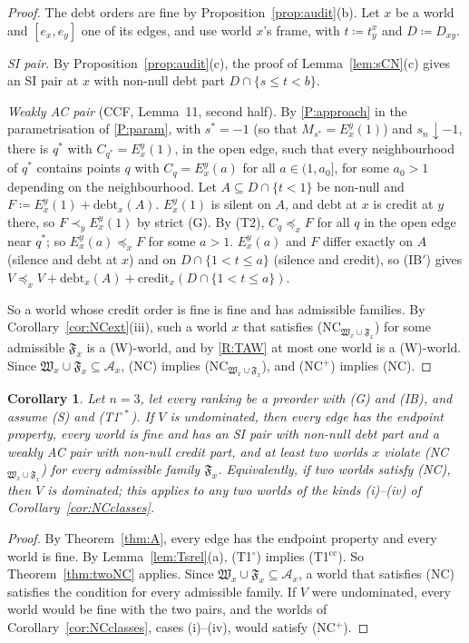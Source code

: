 \documentclass[11pt]{article}
\newtheorem{corollary}[theorem]{Corollary}
\theoremstyle{definition}\newtheorem{definition}[theorem]{Definition}
\theoremstyle{remark}\newtheorem{remark}[theorem]{Remark}
\newcommand{\debt}{\mathrm{debt}}
\newcommand{\cred}{\mathrm{credit}}
\newcommand{\To}{\textup{(T1$^\circ$)}}
\newcommand{\Tos}{\textup{(T1$^{\circ*}$)}}
\newcommand{\Tcc}{\textup{(T1$^{\mathrm{cc}}$)}}
\begin{document}
\begin{proof}
The debt orders are fine by Proposition~\ref{prop:audit}(b). Let $x$ be a
world and $[e_x,e_y]$ one of its edges, and use world $x$'s frame, with
$t\coloneqq t^x_y$ and $D\coloneqq D_{xy}$.

\emph{SI pair.} By Proposition~\ref{prop:audit}(c), the proof of
Lemma~\ref{lem:sCN}(c) gives an SI pair at $x$ with non-null debt part
$D\cap\{s\le t<b\}$.

\emph{Weakly AC pair} (CCF, Lemma~11, second half). By \ref{P:approach}
in the parametrisation of \ref{P:param}, with $s^*=-1$ (so that
$M_{s^*}=E^y_x(1)$) and $s_n\downarrow-1$, there is $q^*$ with
$C_{q^*}=E^y_x(1)$, in the open edge, such that every neighbourhood of $q^*$
contains points $q$ with $C_q=E^y_x(a)$ for all $a\in(1,a_0]$, for some
$a_0>1$ depending on the neighbourhood. Let $A\subseteq D\cap\{t<1\}$ be
non-null and $F\coloneqq E^y_x(1)+\debt_x(A)$. $E^y_x(1)$ is silent on $A$,
and debt at $x$ is credit at $y$ there, so $F\prec_yE^y_x(1)$ by strict (G).
By (T2), $C_q\preceq_xF$ for all $q$ in the open edge near $q^*$; so
$E^y_x(a)\preceq_xF$ for some $a>1$. $E^y_x(a)$ and $F$ differ exactly on $A$ (silence
and debt at $x$) and on $D\cap\{1<t\le a\}$ (silence and credit), so (IB$'$)
gives $V\preceq_xV+\debt_x(A)+\cred_x(D\cap\{1<t\le a\})$.

So a world whose credit order is fine is fine and has admissible families.
By Corollary~\ref{cor:NCext}(iii), such a world $x$ that satisfies
(NC$_{\mathfrak W_x\cup\mathfrak F_x}$) for some admissible
$\mathfrak F_x$ is a (W)-world, and by \ref{R:TAW} at most one world is a
(W)-world. Since $\mathfrak W_x\cup\mathfrak F_x\subseteq\mathcal A_x$,
(NC) implies (NC$_{\mathfrak W_x\cup\mathfrak F_x}$), and (NC$^+$) implies
(NC).
\end{proof}

\begin{corollary}\label{cor:twoNC}
Let $n=3$, let every ranking be a preorder with (G) and (IB), and assume (S)
and \Tos. If $V$ is undominated, then every edge has the endpoint property,
every world is fine and has an SI pair with non-null debt part and a weakly
AC pair with non-null credit part, and at least two worlds $x$ violate
(NC$_{\mathfrak W_x\cup\mathfrak F_x}$) for every admissible family
$\mathfrak F_x$. Equivalently, if two worlds satisfy (NC), then $V$ is
dominated; this applies to any two worlds of the kinds (i)--(iv) of
Corollary~\ref{cor:NCclasses}.
\end{corollary}
\begin{proof}
By Theorem~\ref{thm:A}, every edge has the endpoint property and every
world is fine. By Lemma~\ref{lem:Tsrel}(a), \To{} implies \Tcc. So
Theorem~\ref{thm:twoNC} applies. Since $\mathfrak W_x\cup\mathfrak
F_x\subseteq\mathcal A_x$, a world that satisfies (NC) satisfies the
condition for every admissible family. If $V$ were undominated, every world
would be fine with the two pairs, and the worlds of
Corollary~\ref{cor:NCclasses}, cases (i)--(iv), would satisfy (NC$^+$).
\end{proof}
\end{document}
